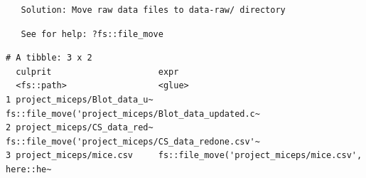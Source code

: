 \documentclass[12pt,twoside]{reedthesis}
\begin{document}
\begin{verbatim}
   Solution: Move raw data files to data-raw/ directory
\end{verbatim}
\begin{verbatim}
   See for help: ?fs::file_move
\end{verbatim}
\begin{verbatim}
# A tibble: 3 x 2
  culprit                     expr                                              
  <fs::path>                  <glue>                                            
1 project_miceps/Blot_data_u~ fs::file_move('project_miceps/Blot_data_updated.c~
2 project_miceps/CS_data_red~ fs::file_move('project_miceps/CS_data_redone.csv'~
3 project_miceps/mice.csv     fs::file_move('project_miceps/mice.csv', here::he~
\end{verbatim}
\normalsize
\end{document}
